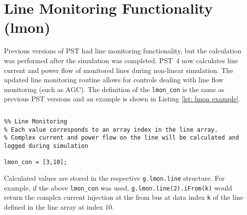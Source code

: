 \section{Line Monitoring Functionality (lmon)}  
Previous versions of PST had line monitoring functionality, but the calculation was performed after the simulation was completed.
\mbox{PST 4} now calculates line current and power flow of monitored lines during non-linear simulation.
The updated line monitoring routine allows for controls dealing with line flow monitoring (such as AGC).
The definition of the \verb|lmon_con| is the same as previous PST versions and an example is shown in Listing \ref{lst: lmon example}.

\begin{lstlisting}[caption={Line Monitoring Definition Example},label={lst: lmon example}]
\end{lstlisting}\vspace{-2 em}
\begin{verbatim}
%% Line Monitoring
% Each value corresponds to an array index in the line array.
% Complex current and power flow on the line will be calculated and logged during simulation

lmon_con = [3,10]; 
\end{verbatim}
\noindent Calculated values are stored in the respective \verb|g.lmon.line| structure.
For example, if the above \verb|lmon_con| was used, \verb|g.lmon.line(2).iFrom(k)| would return the complex current injection at the from bus at data index \verb|k| of the line defined in the line array at index 10.
